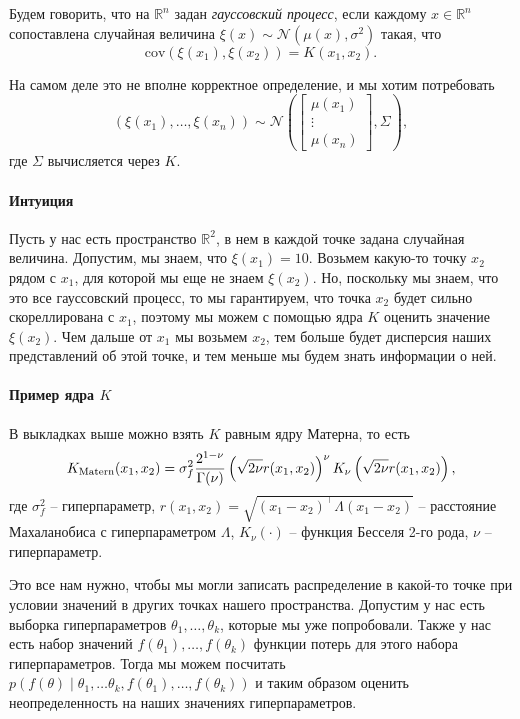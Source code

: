 \documentclass[12pt, fleqn]{article}
\begin{document}
\begin{vkDef}[GPGO]
	Будем говорить, что на $\mathbb{R}^{n}$ задан {\it гауссовский процесс}, если каждому $x \in \mathbb{R}^{n}$ сопоставлена случайная величина $\xi(x) \sim \mathcal{N}(\mu(x), \sigma^{2})$ такая, что
	\[
		\mathrm{cov} \left( \xi(x_{1}), \xi(x_{2}) \right) = K(x_{1}, x_{2}).
	\]
\end{vkDef}
На самом деле это не вполне корректное определение, и мы хотим потребовать
\[
	\left( \xi(x_{1}), \ldots, \xi(x_{n}) \right) \sim \mathcal{N} \left( \begin{bmatrix}
		\mu(x_{1}) \\
		\vdots \\
		\mu(x_{n})
	\end{bmatrix}, \Sigma \right),
\]
где $\Sigma$ вычисляется через $K$.

\paragraph{Интуиция}

Пусть у нас есть пространство $\mathbb{R}^{2}$, в нем в каждой точке задана случайная величина.
Допустим, мы знаем, что $\xi(x_{1}) = 10$.
Возьмем какую-то точку $x_{2}$ рядом с $x_{1}$, для которой мы еще не знаем $\xi(x_{2})$.
Но, поскольку мы знаем, что это все гауссовский процесс, то мы гарантируем, что точка $x_{2}$ будет сильно скореллирована с $x_{1}$, поэтому мы можем с помощью ядра $K$ оценить значение $\xi(x_{2})$.
Чем дальше от $x_{1}$ мы возьмем $x_{2}$, тем больше будет дисперсия наших представлений об этой точке, и тем меньше мы будем знать информации о ней.

\paragraph{Пример ядра $K$}

В выкладках выше можно взять $K$ равным ядру Матерна, то есть
\[
	K_{\rm Matern}(x_{1}, x_{2}) = \sigma^{2}_{f} \frac{2^{1 - \nu}}{\Gamma(\nu)} \left(\sqrt{2 \nu} r(x_{1}, x_{2})\right)^{\nu} K_{\nu}\left(\sqrt{2\nu} r(x_{1}, x_{2})\right),
\]
где $\sigma^{2}_{f}$ -- гиперпараметр, $r(x_{1}, x_{2}) = \sqrt{(x_{1} - x_{2})^{\top} \Lambda (x_{1} - x_{2})}$ -- расстояние Махаланобиса с гиперпараметром $\Lambda$, $K_{\nu}(\cdot)$ -- функция Бесселя 2-го рода, $\nu$ -- гиперпараметр.

Это все нам нужно, чтобы мы могли записать распределение в какой-то точке при условии значений в других точках нашего пространства.
Допустим у нас есть выборка гиперпараметров $\theta_{1}, \ldots, \theta_{k}$, которые мы уже попробовали.
Также у нас есть набор значений $f(\theta_{1}), \ldots, f(\theta_{k})$ функции потерь для этого набора гиперпараметров.
Тогда мы можем посчитать $p(f(\theta) \mid \theta_{1}, \ldots \theta_{k}, f(\theta_{1}), \ldots, f(\theta_{k}))$ и таким образом оценить неопределенность на наших значениях гиперпараметров.
\end{document}
